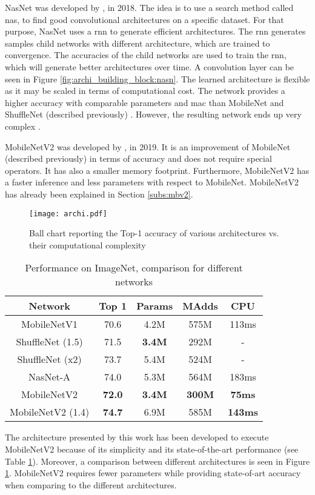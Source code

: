 NasNet was developed by \textcite{zoph_learning_2018}, in 2018. The idea is to use a search method called \acrfull{nas}, to find good convolutional architectures on a specific dataset. For that purpose, NasNet uses a \acrfull{rnn} to generate efficient architectures. The \acrshort{rnn} generates samples child networks with different architecture, which are trained to convergence. The accuracies of the child networks are used to train the \acrshort{rnn}, which will generate better architectures over time. A convolution layer can be seen in Figure \ref{fig:archi_building_block:nasn}. The learned architecture is flexible as it may be scaled in terms of computational cost. The network provides a higher accuracy with comparable parameters and \acrshort{mac} than MobileNet and ShuffleNet (described previously) \cite{zoph_learning_2018}. However, the resulting network ends up very complex \cite{sandler_mobilenetv2_2018}.

MobileNetV2 was developed by \textcite{sandler_mobilenetv2_2018}, in 2019. It is an improvement of MobileNet (described previously) in terms of accuracy and does not require special operators. It has also a smaller memory footprint. Furthermore, MobileNetV2 has a faster inference and less parameters with respect to MobileNet. MobileNetV2 has already been explained in Section \ref{subs:mbv2}.

\begin{figure}
    \centering
    \texttt{[image: archi.pdf]}
    \caption{Ball chart reporting the Top-1 accuracy of various architectures vs. their computational complexity \cite{canziani_analysis_2017}}
    \label{fig:archi}
\end{figure}
%
\begin{table}
    \center
    \begin{tabular}{ | c | c | c c | c| }
        \hline \hline
        Network & Top 1 & Params & MAdds & CPU \\
        \hline \hline
        MobileNetV1 & 70.6 & 4.2M & 575M & 113ms \\
        ShuffleNet (1.5) & 71.5 & \textbf{3.4M} & 292M & - \\
        ShuffleNet (x2)  & 73.7 & 5.4M & 524M & - \\
        NasNet-A & 74.0 & 5.3M & 564M & 183ms \\
        \hline
        MobileNetV2 & \textbf{72.0} & \textbf{3.4M} & \textbf{300M} & \textbf{75ms} \\
        MobileNetV2 (1.4) & \textbf{74.7} & 6.9M & 585M & \textbf{143ms} \\
        \hline \hline
    \end{tabular}
    \caption{Performance on ImageNet, comparison for different networks \cite{sandler_mobilenetv2_2018}}
    \label{tab:mbv2}
\end{table}
%
The architecture presented by this work has been developed to execute MobileNetV2 because of its simplicity and its state-of-the-art performance (see Table \ref{tab:mbv2}). Moreover, a comparison between different architectures is seen in Figure \ref{fig:archi}. MobileNetV2 requires fewer parameters while providing state-of-art accuracy when comparing to the different architectures.
%
